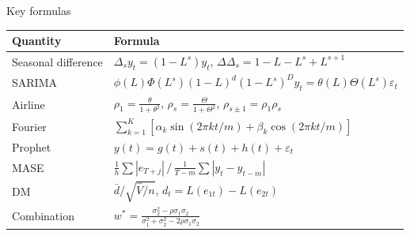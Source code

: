 \begin{frame}{Key formulas}
\itemsize{\small}
{\renewcommand{\arraystretch}{1.35}\begin{center}
\scriptsize
\begin{tabular}{ll}
\toprule
\textbf{Quantity} & \textbf{Formula} \\
\midrule
Seasonal difference & $\Delta_sy_t = (1 - L^s)y_t$, \quad $\Delta\Delta_s = 1 - L - L^s + L^{s+1}$ \\
SARIMA & $\phi(L)\Phi(L^s)(1 - L)^d(1 - L^s)^Dy_t = \theta(L)\Theta(L^s)\varepsilon_t$ \\
Airline & $\rho_1 = \frac{\theta}{1 + \theta^2}$, \quad $\rho_s = \frac{\Theta}{1 + \Theta^2}$, \quad $\rho_{s \pm 1} = \rho_1\rho_s$ \\
Fourier & $\sum_{k=1}^{K}[\alpha_k\sin(2\pi kt/m) + \beta_k\cos(2\pi kt/m)]$ \\
Prophet & $y(t) = g(t) + s(t) + h(t) + \varepsilon_t$ \\
MASE & $\frac1h\sum|e_{T+j}| \,/\, \frac{1}{T - m}\sum|y_t - y_{t-m}|$ \\
DM & $\bar d/\sqrt{\hat V/n}$, \quad $d_t = L(e_{1t}) - L(e_{2t})$ \\
Combination & $w^* = \frac{\sigma_2^2 - \rho\sigma_1\sigma_2}{\sigma_1^2 + \sigma_2^2 - 2\rho\sigma_1\sigma_2}$ \\
\bottomrule
\end{tabular}
\end{center}
}
\end{frame}

